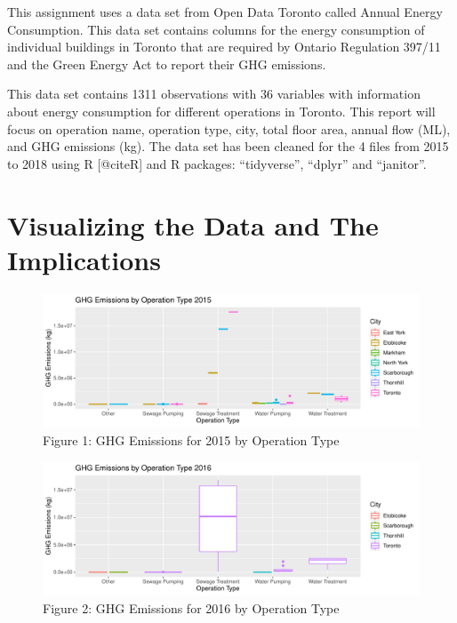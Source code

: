 \documentclass[
  letterpaper,
  DIV=11,
  numbers=noendperiod]{scrartcl}
\begin{document}
This assignment uses a data set from Open Data Toronto called Annual
Energy Consumption. This data set contains columns for the energy
consumption of individual buildings in Toronto that are required by
Ontario Regulation 397/11 and the Green Energy Act to report their GHG
emissions.

This data set contains 1311 observations with 36 variables with
information about energy consumption for different operations in
Toronto. This report will focus on operation name, operation type, city,
total floor area, annual flow (ML), and GHG emissions (kg). The data set
has been cleaned for the 4 files from 2015 to 2018 using R {[}@citeR{]}
and R packages: ``tidyverse'', ``dplyr'' and ``janitor''.

\hypertarget{visualizing-the-data-and-the-implications}{%
\section{Visualizing the Data and The
Implications}\label{visualizing-the-data-and-the-implications}}

\begin{figure}

{\centering \includegraphics{paper_files/figure-pdf/unnamed-chunk-4-1.pdf}

}

\caption{Figure 1: GHG Emissions for 2015 by Operation Type}

\end{figure}

\begin{figure}

{\centering \includegraphics{paper_files/figure-pdf/unnamed-chunk-6-1.pdf}

}

\caption{Figure 2: GHG Emissions for 2016 by Operation Type}

\end{figure}
\end{document}
